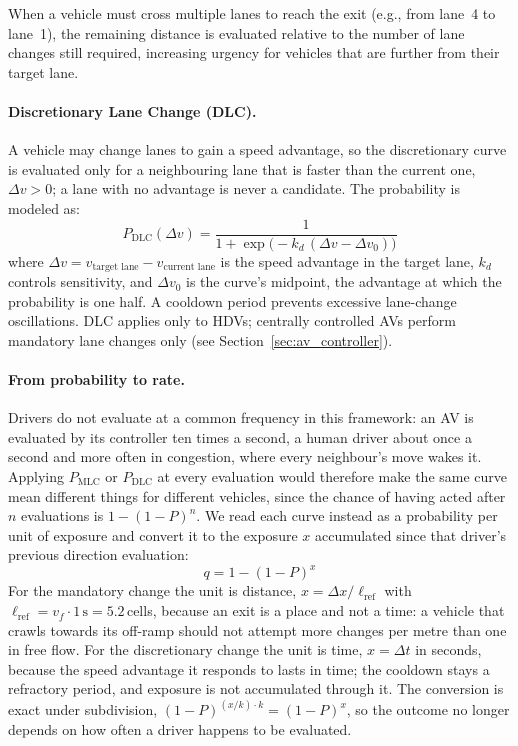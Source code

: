 \documentclass[review,authoryear]{elsarticle}
\begin{document}
When a vehicle must cross multiple lanes to reach the exit (e.g., from lane~4 to lane~1), the remaining distance is evaluated relative to the number of lane changes still required, increasing urgency for vehicles that are further from their target lane.

\paragraph{Discretionary Lane Change (DLC).}
A vehicle may change lanes to gain a speed advantage, so the discretionary curve is evaluated only for a neighbouring lane that is faster than the current one, $\Delta v > 0$; a lane with no advantage is never a candidate. The probability is modeled as:
\begin{equation}
    P_{\text{DLC}}(\Delta v) = \frac{1}{1 + \exp\!\big(-k_d\,(\Delta v - \Delta v_0)\big)}
    \label{eq:dlc_logistic}
\end{equation}
where $\Delta v = v_{\text{target lane}} - v_{\text{current lane}}$ is the speed advantage in the target lane, $k_d$ controls sensitivity, and $\Delta v_0$ is the curve's midpoint, the advantage at which the probability is one half. A cooldown period prevents excessive lane-change oscillations. DLC applies only to HDVs; centrally controlled AVs perform mandatory lane changes only (see Section~\ref{sec:av_controller}).

\paragraph{From probability to rate.}
Drivers do not evaluate at a common frequency in this framework: an AV is evaluated by its controller ten times a second, a human driver about once a second and more often in congestion, where every neighbour's move wakes it. Applying $P_{\text{MLC}}$ or $P_{\text{DLC}}$ at every evaluation would therefore make the same curve mean different things for different vehicles, since the chance of having acted after $n$ evaluations is $1 - (1-P)^n$. We read each curve instead as a probability per unit of exposure and convert it to the exposure $x$ accumulated since that driver's previous direction evaluation:
\begin{equation}
    q = 1 - (1 - P)^{x}
    \label{eq:lc_rate}
\end{equation}
For the mandatory change the unit is distance, $x = \Delta x / \ell_{\text{ref}}$ with $\ell_{\text{ref}} = v_f \cdot 1\,\text{s} = 5.2$\,cells, because an exit is a place and not a time: a vehicle that crawls towards its off-ramp should not attempt more changes per metre than one in free flow. For the discretionary change the unit is time, $x = \Delta t$ in seconds, because the speed advantage it responds to lasts in time; the cooldown stays a refractory period, and exposure is not accumulated through it. The conversion is exact under subdivision, $(1-P)^{(x/k) \cdot k} = (1-P)^x$, so the outcome no longer depends on how often a driver happens to be evaluated.
\end{document}
